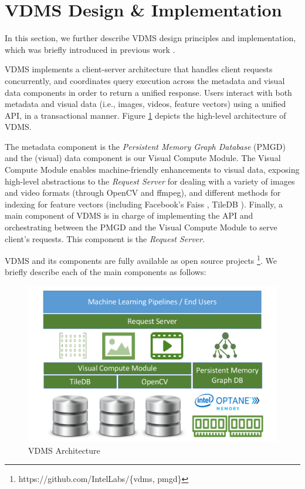 \section{VDMS Design \& Implementation}
\label{arch}

In this section, we further describe VDMS design principles and implementation,
which was briefly introduced in previous work \cite{vdms-nips}.

VDMS implements a client-server architecture that handles client
requests concurrently, and coordinates query execution across
the metadata and visual data components in order to return a unified response.
Users interact with both metadata and visual data
(i.e., images, videos, feature vectors) using a unified API,
in a transactional manner.
Figure \ref{fig:arch} depicts the high-level architecture of VDMS.

The metadata component is the \textit{Persistent Memory Graph
Database} (PMGD) and the (visual) data component is our Visual Compute Module.
The Visual Compute Module enables machine-friendly enhancements to
visual data, exposing high-level abstractions to the \textit{Request Server}
for dealing with a variety of images and video formats (through OpenCV and ffmpeg),
and different methods for indexing for feature vectors
(including Facebook's Faiss \cite{faiss}, TileDB \cite{TileDB}).
Finally, a main component of VDMS is in charge of implementing the API and orchestrating between the PMGD and the Visual Compute Module
to serve client's requests. This component is the \textit{Request Server}.

VDMS and its components are fully available as open source projects
\footnote{https://github.com/IntelLabs/\{vdms, pmgd\}}.
We briefly describe each of the main components as follows:

\begin{figure}
\centering
\includegraphics[width=1\columnwidth]{figures/vdms_arch.pdf}
\caption{VDMS Architecture}
\label{fig:arch}
\end{figure}

